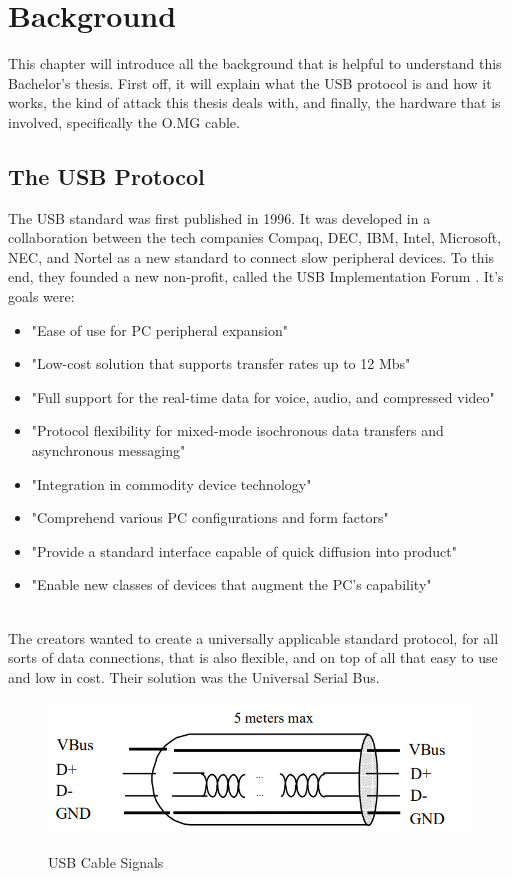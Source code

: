 \chapter{Background} \label{Background}


This chapter will introduce all the background that is helpful to understand this Bachelor's thesis. 
First off, it will explain what the USB protocol is and how it works, the kind of attack this thesis deals with, and finally, the hardware that is involved, specifically the O.MG cable. 

\section{The USB Protocol} \label{TheUSBProtocol}

The USB standard \cite{WaybackMachine2018} was first published in 1996. It was developed in a collaboration between the tech companies Compaq, DEC, IBM, Intel, Microsoft, NEC, and Nortel as a new standard to connect slow peripheral devices. To this end, they founded a new non-profit, called the USB Implementation Forum \cite{USBIFUSBIF}. It's goals were:
\begin{itemize}
    \item "Ease of use for PC peripheral expansion"
    \item "Low-cost solution that supports transfer rates up to 12 Mbs"
    \item "Full support for the real-time data for voice, audio, and compressed video"
    \item "Protocol flexibility for mixed-mode isochronous data transfers and asynchronous messaging"
    \item "Integration in commodity device technology"
    \item "Comprehend various PC configurations and form factors"
    \item "Provide a standard interface capable of quick diffusion into product"
    \item "Enable new classes of devices that augment the PC's capability"  
\end{itemize}
\cite[p.~23]{WaybackMachine2018}\\
The creators wanted to create a universally applicable standard protocol, for all sorts of data connections, that is also flexible, and on top of all that easy to use and low in cost. Their solution was the Universal Serial Bus.

\begin{figure}
    \centering
    \includegraphics[width=0.5\linewidth]{visuals/usbsingalgraphic.png}
    \caption{USB Cable Signals}
    \label{fig:usbsingalgraphic}
    \cite{WaybackMachine2018}
\end{figure}

